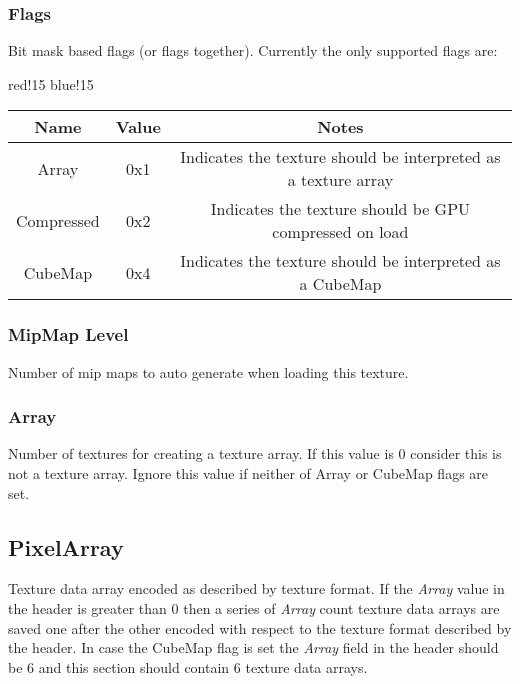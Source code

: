 \subsubsection{Flags}
Bit mask based flags (or flags together). Currently the only supported flags are:
\begin{center}
    {
        {red!15}
        {blue!15}
        \begin{tabular}{|c|c|c|}
            \hline
            \textbf{Name} & \textbf{Value} & \textbf{Notes} \\
    
            \hline\hline
            Array & 0x1 & Indicates the texture should be interpreted as a texture array \\
            Compressed & 0x2 & Indicates the texture should be GPU compressed on load \\
            CubeMap & 0x4 & Indicates the texture should be interpreted as a CubeMap \\
            \hline
        \end{tabular}
    }
\end{center}

\subsubsection{MipMap Level}
Number of mip maps \cite{MipMap} to auto generate when loading this texture.

\subsubsection{Array}
Number of textures for creating a texture array. If this value is 0 consider this is not a texture array.\newline
Ignore this value if neither of Array or CubeMap flags are set.

\subsection{PixelArray}
Texture data array encoded as described by texture format.\newline
If the \textit{Array} value in the header is greater than 0 then a series of \textit{Array} count texture data arrays are saved one after the other encoded with respect to the texture format described by the header.\newline
In case the CubeMap flag is set the \textit{Array} field in the header should be 6 and this section should contain 6 texture data arrays.